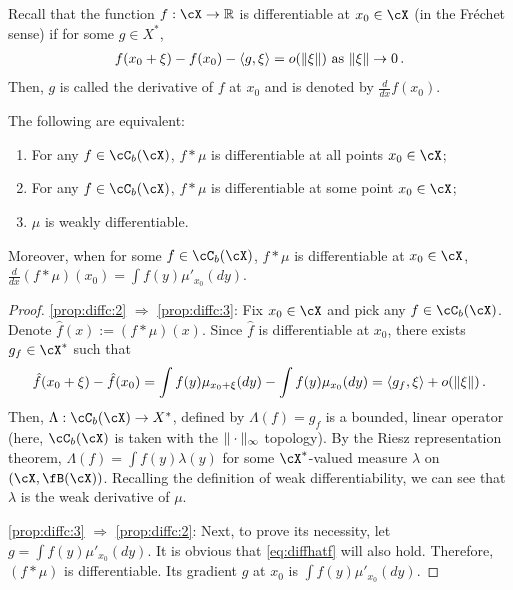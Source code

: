 \documentclass[11pt,letterpaper,english]{article}
\newcommand{\Borel}{\fB}
\newcommand{\Cb}{\cC_b}
\begin{document}
Recall that the function $f: \cX \to \R$ is differentiable at $x_0\in \cX$ (in the Fr\'echet sense) if 
for some $g\in X^*$,
\begin{align*}
f(x_0+\xi) - f(x_0) - \langle g,\xi \rangle = o(\|\xi\|) \text{ as } \|\xi\| \to 0\,.
\end{align*}
Then, $g$ is called the derivative of $f$ at $x_0$ and is denoted by $\frac{d}{dx}f(x_0)$.
\begin{proposition}
\label{prop:diffconvolution}
The following are equivalent:
\begin{enumerate}
\item \label{prop:diffc:1}
	 For any $f \in \Cb(\cX)$, $f*\mu$ is differentiable at all points $x_0\in \cX$; 
\item \label{prop:diffc:2}
	 For any $f \in \Cb(\cX)$, $f*\mu$ is differentiable at some point $x_0\in \cX$; 
\item \label{prop:diffc:3}
	 $\mu$ is weakly differentiable. 
\end{enumerate}
Moreover, when  for some $f\in \Cb(\cX)$, $f*\mu$ is differentiable at $x_0\in \cX$,
$\frac{d}{dx} (f*\mu) (x_0) = \int f(y)\mu'_{x_0}(dy)$.
\end{proposition}
\begin{proof}
 \eqref{prop:diffc:2} $\Rightarrow$ \eqref{prop:diffc:3}:
 Fix $x_0\in \cX$ and pick any $f\in\Cb(\cX)$.
Denote $\hat{f}(x) := (f*\mu)(x)$. 
Since $\hat{f}$ is differentiable at $x_0$, there exists $g_f \in \cX^*$ such that
\begin{align}
\label{eq:diffhatf}
\hat{f}(x_0+\xi) - \hat{f}(x_0) 
= \int f(y)\mu_{x_0+\xi}(dy) - \int f(y)\mu_{x_0}(dy)
= \langle g_f, \xi \rangle+o(\|\xi\|) \,.
\end{align}
Then, $\Lambda:\Cb(\cX) \to X^*$, defined by $\Lambda(f)= g_f$ is a bounded, linear operator (here, $\Cb(\cX)$ is taken with the $\|\cdot\|_\infty$ topology). By the Riesz representation theorem,   
$\Lambda(f) = \int f(y) \lambda(y)$ for some $\cX^*$-valued measure $\lambda$ on $(\cX,\Borel(\cX))$.
Recalling the definition of weak differentiability, we can see that $\lambda$ is the weak derivative of $\mu$. 

 \eqref{prop:diffc:3} $\Rightarrow$ \eqref{prop:diffc:2}:
Next, to prove its necessity, let $g=\int f(y)\mu'_{x_0}(dy)$. It is obvious that \eqref{eq:diffhatf} will also hold. Therefore, $(f*\mu)$ is differentiable. Its gradient $g$ at $x_0$ is $\int f(y)\mu'_{x_0}(dy)$.
\end{proof}
\end{document}
